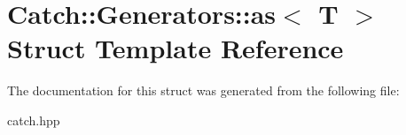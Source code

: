 \hypertarget{structCatch_1_1Generators_1_1as}{}\section{Catch\+::Generators\+::as$<$ T $>$ Struct Template Reference}
\label{structCatch_1_1Generators_1_1as}


The documentation for this struct was generated from the following file\+:\begin{DoxyCompactItemize}
\item 
catch.\+hpp\end{DoxyCompactItemize}
